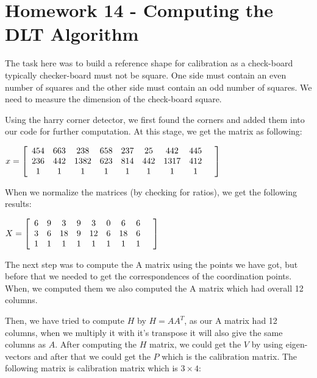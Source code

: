 \documentclass[]{article}
\begin{document}
\section{Homework 14 - Computing the DLT Algorithm}

The task here was to build a reference shape for calibration as a check-board typically checker-board must not be square. One side must contain an even number of squares and the other side must contain an odd number of squares. We need to measure the dimension of the check-board square. 

Using the harry corner detector, we first found the corners and added them into our code for further computation. At this stage, we get the matrix as following: 

\vspace{0.5em}

\centerline {
	$ x =\left[ {\begin{array}{*{20}c}
		454 & 663 & 238 & 658 & 237 & 25 & 442 & 445 \\
		236 & 442 & 1382 & 623 & 814 & 442 & 1317 & 412 \\
		1 & 1 & 1 & 1 & 1 & 1 & 1 & 1 &  
		\end{array} } \right] $
}

\vspace{0.5em}

When we normalize the matrices (by checking for ratios), we get the following results: 

\vspace{0.5em}

\centerline {
	$ X =\left[ {\begin{array}{*{20}c}
		6 & 9 & 3 & 9 & 3 & 0 & 6 & 6 \\
		3 & 6 & 18 & 9 & 12 & 6 & 18 & 6 \\
		1 & 1 & 1 & 1 & 1 & 1 & 1 & 1 &  
		\end{array} } \right] $
}

\vspace{0.5em}

The next step was to compute the A matrix using the points we have got, but before that we needed to get the correspondences of the coordination points. When, we computed them we also computed the A matrix which had overall 12 columns. 

Then, we have tried to compute $H$ by $H=AA^T$, as our A matrix had 12 columns, when we multiply it with it's transpose it will also give the same columns as $A$. After computing the $H$ matrix, we could get the $V$ by using eigen-vectors and after that we could get the $P$ which is the calibration matrix. The following matrix is calibration matrix which is $3 \times 4$:
\end{document}
